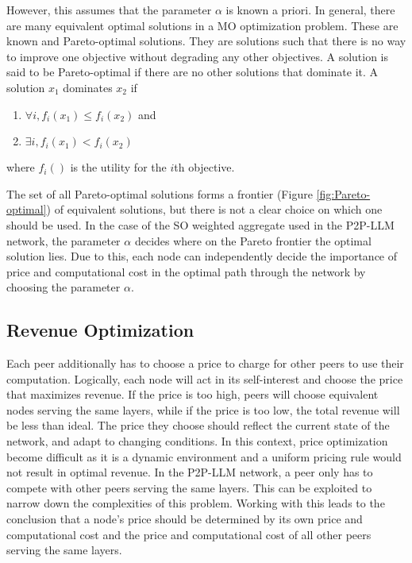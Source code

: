 \documentclass[preprint,twoside,11pt]{article}
\begin{document}
However, this assumes that the parameter $\alpha$ is known a priori. In general, there are many equivalent optimal solutions in a MO optimization problem.
These are known and Pareto-optimal solutions. They are solutions such that there is no way to improve one objective without degrading any other objectives.
A solution is said to be Pareto-optimal if there are no other solutions that dominate it. A solution $x_1$ dominates $x_2$ if
\begin{enumerate}
	\item $\forall i, f_i(x_1) \leq f_i(x_2)$ and
	\item $\exists i, f_i(x_1) < f_i(x_2)$
\end{enumerate}
where $f_i()$ is the utility for the $i$th objective.

The set of all Pareto-optimal solutions forms a frontier (Figure \ref{fig:Pareto-optimal}) of equivalent solutions, but there is not a clear choice on which one should be used.
In the case of the SO weighted aggregate used in the P2P-LLM network, the parameter $\alpha$ decides where on the Pareto frontier the optimal solution lies.
Due to this, each node can independently decide the importance of price and computational cost in the optimal path through the network by choosing the parameter $\alpha$.

\subsection{Revenue Optimization}

Each peer additionally has to choose a price to charge for other peers to use their computation.
Logically, each node will act in its self-interest and choose the price that maximizes revenue.
If the price is too high, peers will choose equivalent nodes serving the same layers,
while if the price is too low, the total revenue will be less than ideal.
The price they choose should reflect the current state of the network, and adapt to changing conditions.
In this context, price optimization become difficult as it is a dynamic environment
and a uniform pricing rule would not result in optimal revenue.
In the P2P-LLM network, a peer only has to compete with other peers serving the same layers.
This can be exploited to narrow down the complexities of this problem.
Working with this leads to the conclusion that a node's price should be determined
by its own price and computational cost and the price and computational cost of all other peers serving the same layers.
\end{document}
